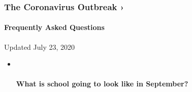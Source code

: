\hypertarget{the-coronavirus-outbreak-}{%
\subsubsection{The Coronavirus Outbreak
›}\label{the-coronavirus-outbreak-}}

\hypertarget{frequently-asked-questions}{%
\paragraph{Frequently Asked
Questions}\label{frequently-asked-questions}}

Updated July 23, 2020

\begin{itemize}
\item ~
  \hypertarget{what-is-school-going-to-look-like-in-september}{%
  \paragraph{What is school going to look like in
  September?}\label{what-is-school-going-to-look-like-in-september}}


\end{itemize}
